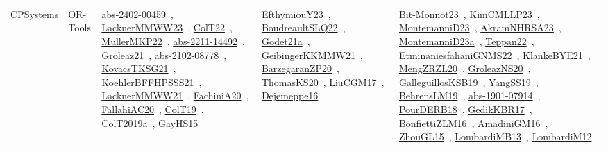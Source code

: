 {\begin{longtable}{lp{3cm}>{\raggedright\arraybackslash}p{6cm}>{\raggedright\arraybackslash}p{6cm}>{\raggedright\arraybackslash}p{8cm}}
CPSystems & OR-Tools & \href{../works/abs-2402-00459.pdf}{abs-2402-00459}~\cite{abs-2402-00459}, \href{../works/LacknerMMWW23.pdf}{LacknerMMWW23}~\cite{LacknerMMWW23}, \href{../works/ColT22.pdf}{ColT22}~\cite{ColT22}, \href{../works/MullerMKP22.pdf}{MullerMKP22}~\cite{MullerMKP22}, \href{../works/abs-2211-14492.pdf}{abs-2211-14492}~\cite{abs-2211-14492}, \href{../works/Groleaz21.pdf}{Groleaz21}~\cite{Groleaz21}, \href{../works/abs-2102-08778.pdf}{abs-2102-08778}~\cite{abs-2102-08778}, \href{../works/KovacsTKSG21.pdf}{KovacsTKSG21}~\cite{KovacsTKSG21}, \href{../works/KoehlerBFFHPSSS21.pdf}{KoehlerBFFHPSSS21}~\cite{KoehlerBFFHPSSS21}, \href{../works/LacknerMMWW21.pdf}{LacknerMMWW21}~\cite{LacknerMMWW21}, \href{../works/FachiniA20.pdf}{FachiniA20}~\cite{FachiniA20}, \href{../works/FallahiAC20.pdf}{FallahiAC20}~\cite{FallahiAC20}, \href{../works/ColT19.pdf}{ColT19}~\cite{ColT19}, \href{../works/ColT2019a.pdf}{ColT2019a}~\cite{ColT2019a}, \href{../works/GayHS15.pdf}{GayHS15}~\cite{GayHS15} & \href{../works/EfthymiouY23.pdf}{EfthymiouY23}~\cite{EfthymiouY23}, \href{../works/BoudreaultSLQ22.pdf}{BoudreaultSLQ22}~\cite{BoudreaultSLQ22}, \href{../works/Godet21a.pdf}{Godet21a}~\cite{Godet21a}, \href{../works/GeibingerKKMMW21.pdf}{GeibingerKKMMW21}~\cite{GeibingerKKMMW21}, \href{../works/BarzegaranZP20.pdf}{BarzegaranZP20}~\cite{BarzegaranZP20}, \href{../works/ThomasKS20.pdf}{ThomasKS20}~\cite{ThomasKS20}, \href{../works/LiuCGM17.pdf}{LiuCGM17}~\cite{LiuCGM17}, \href{../works/Dejemeppe16.pdf}{Dejemeppe16}~\cite{Dejemeppe16} & \href{../works/Bit-Monnot23.pdf}{Bit-Monnot23}~\cite{Bit-Monnot23}, \href{../works/KimCMLLP23.pdf}{KimCMLLP23}~\cite{KimCMLLP23}, \href{../works/MontemanniD23.pdf}{MontemanniD23}~\cite{MontemanniD23}, \href{../works/AkramNHRSA23.pdf}{AkramNHRSA23}~\cite{AkramNHRSA23}, \href{../works/MontemanniD23a.pdf}{MontemanniD23a}~\cite{MontemanniD23a}, \href{../works/Teppan22.pdf}{Teppan22}~\cite{Teppan22}, \href{../works/EtminaniesfahaniGNMS22.pdf}{EtminaniesfahaniGNMS22}~\cite{EtminaniesfahaniGNMS22}, \href{../works/KlankeBYE21.pdf}{KlankeBYE21}~\cite{KlankeBYE21}, \href{../works/MengZRZL20.pdf}{MengZRZL20}~\cite{MengZRZL20}, \href{../works/GroleazNS20.pdf}{GroleazNS20}~\cite{GroleazNS20}, \href{../works/GalleguillosKSB19.pdf}{GalleguillosKSB19}~\cite{GalleguillosKSB19}, \href{../works/YangSS19.pdf}{YangSS19}~\cite{YangSS19}, \href{../works/BehrensLM19.pdf}{BehrensLM19}~\cite{BehrensLM19}, \href{../works/abs-1901-07914.pdf}{abs-1901-07914}~\cite{abs-1901-07914}, \href{../works/PourDERB18.pdf}{PourDERB18}~\cite{PourDERB18}, \href{../works/GedikKBR17.pdf}{GedikKBR17}~\cite{GedikKBR17}, \href{../works/BonfiettiZLM16.pdf}{BonfiettiZLM16}~\cite{BonfiettiZLM16}, \href{../works/AmadiniGM16.pdf}{AmadiniGM16}~\cite{AmadiniGM16}, \href{../works/ZhouGL15.pdf}{ZhouGL15}~\cite{ZhouGL15}, \href{../works/LombardiMB13.pdf}{LombardiMB13}~\cite{LombardiMB13}, \href{../works/LombardiM12.pdf}{LombardiM12}~\cite{LombardiM12}\\

\end{longtable}}
